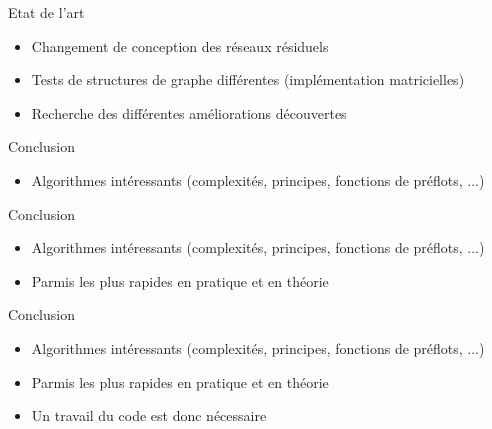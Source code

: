 \documentclass[hyperref={},
xcolor={dvipsnames,svgnames,table},10pt]{beamer}
\begin{document}
\begin{frame}{Etat de l'art}
	\begin{itemize}
		\item Changement de conception des réseaux résiduels
		\item Tests de structures de graphe différentes (implémentation matricielles)
		\item Recherche des différentes améliorations découvertes
	\end{itemize}
\end{frame}

\begin{frame}{Conclusion}
	\begin{itemize}
		\item Algorithmes intéressants (complexités, principes, fonctions de préflots, ...)
	\end{itemize}
\end{frame}

\begin{frame}{Conclusion}
	\begin{itemize}
		\item Algorithmes intéressants (complexités, principes, fonctions de préflots, ...)
		\item Parmis les plus rapides en pratique et en théorie
	\end{itemize}
\end{frame}

\begin{frame}{Conclusion}
	\begin{itemize}
		\item Algorithmes intéressants (complexités, principes, fonctions de préflots, ...)
		\item Parmis les plus rapides en pratique et en théorie
		\item Un travail du code est donc nécessaire
	\end{itemize}
\end{frame}
\end{document}
